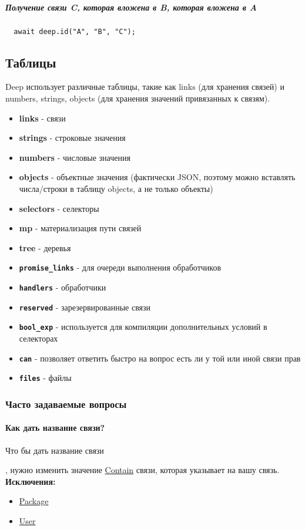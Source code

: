 \documentclass{article}
\begin{document}
\subparagraph{Получение связи C, которая вложена в B, которая вложена в A}
\begin{lstlisting}
  await deep.id("A", "B", "C");
\end{lstlisting}

\subsection{Таблицы}
Deep использует различные таблицы, такие как links (для хранения связей) и
numbers, strings, objects (для хранения значений привязанных к связям).

\begin{itemize}
  \item \textbf{links} - связи
  \item \textbf{strings} - строковые значения
  \item \textbf{numbers} - числовые значения
  \item \textbf{objects} - объектные значения (фактически JSON, поэтому
        можно
        вставлять числа/строки в таблицу objects, а не только объекты)
  \item \textbf{selectors} - селекторы
  \item \textbf{mp} - материализация пути связей
  \item \textbf{tree} - деревья
  \item \textbf{\texttt{promise\_links}} - для очереди выполнения
        обработчиков
  \item \textbf{\texttt{handlers}} - обработчики
  \item \textbf{\texttt{reserved}} - зарезервированные связи
  \item \textbf{\texttt{bool\_exp}} - используется для компиляции
        дополнительных условий в селекторах
  \item \textbf{\texttt{can}} - позволяет ответить быстро на вопрос есть ли
        у
        той или иной связи прав
  \item \textbf{\texttt{files}} - файлы
\end{itemize}

\subsubsection{Часто задаваемые вопросы}
\paragraph{Как дать название связи?}
\hypertarget{FAQ.HowToSetName}{Что бы дать название связи}, нужно изменить
значение \hyperlink{Core.Contain.Description}{Contain} связи, которая указывает
на вашу
связь. \\
\textbf{Исключения:}
\begin{itemize}
  \item \hyperlink{Core.Package.Description}{Package}
  \item \hyperlink{Core.Package.Description}{User}
\end{itemize}
\end{document}
